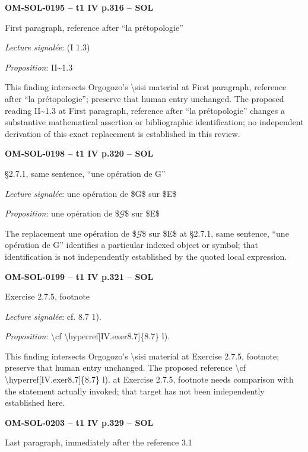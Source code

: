 \par\noindent\textbf{OM-SOL-0195 -- t1 IV p.316 -- SOL}\par
First paragraph, reference after “la prétopologie”\par
\emph{Lecture signalée}: (I 1.3)\par
\emph{Proposition}: II\textasciitilde{}1.3\par
This finding intersects Orgogozo's \textbackslash{}sisi material at First paragraph, reference after “la prétopologie”; preserve that human entry unchanged. The proposed reading II\textasciitilde{}1.3 at First paragraph, reference after “la prétopologie” changes a substantive mathematical assertion or bibliographic identification; no independent derivation of this exact replacement is established in this review.\par
\par\noindent\textbf{OM-SOL-0198 -- t1 IV p.320 -- SOL}\par
§2.7.1, same sentence, “une opération de G”\par
\emph{Lecture signalée}: une opération de \$G\$ sur \$E\$\par
\emph{Proposition}: une opération de \$\ensuremath{𝒢}\$ sur \$E\$\par
The replacement une opération de \$\ensuremath{𝒢}\$ sur \$E\$ at §2.7.1, same sentence, “une opération de G” identifies a particular indexed object or symbol; that identification is not independently established by the quoted local expression.\par
\par\noindent\textbf{OM-SOL-0199 -- t1 IV p.321 -- SOL}\par
Exercise 2.7.5, footnote\par
\emph{Lecture signalée}: cf. 8.7 1).\par
\emph{Proposition}: \textbackslash{}cf \textbackslash{}hyperref[IV.exer8.7]\{8.7\} l).\par
This finding intersects Orgogozo's \textbackslash{}sisi material at Exercise 2.7.5, footnote; preserve that human entry unchanged. The proposed reference \textbackslash{}cf \textbackslash{}hyperref[IV.exer8.7]\{8.7\} l). at Exercise 2.7.5, footnote needs comparison with the statement actually invoked; that target has not been independently established here.\par
\par\noindent\textbf{OM-SOL-0203 -- t1 IV p.329 -- SOL}\par
Last paragraph, immediately after the reference 3.1\par
